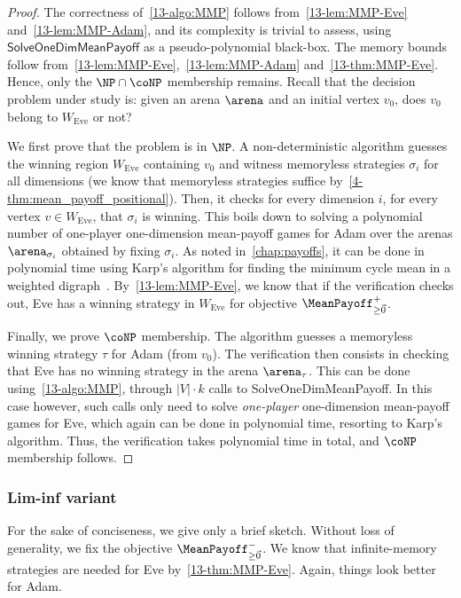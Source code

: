 \begin{proof}
The correctness of~\cref{13-algo:MMP} follows from~\cref{13-lem:MMP-Eve} and~\cref{13-lem:MMP-Adam}, and its complexity is trivial to assess, using $\textsf{SolveOneDimMeanPayoff}$ as a pseudo-polynomial black-box. The memory bounds follow from~\cref{13-lem:MMP-Eve},~\cref{13-lem:MMP-Adam} and~\cref{13-thm:MMP-Eve}. Hence, only the $\NP \cap \coNP$ membership remains. Recall that the decision problem under study is: given an arena $\arena$ and an initial vertex $v_0$, does $v_0$ belong to $W_{\text{Eve}}$ or not?

We first prove that the problem is in $\NP$. A non-deterministic algorithm guesses the winning region $W_{\text{Eve}}$ containing $v_0$ and witness memoryless strategies $\sigma_i$ for all dimensions (we know that memoryless strategies suffice by~\cref{4-thm:mean_payoff_positional}). Then, it checks for every dimension $i$, for every vertex $v \in W_{\text{Eve}}$, that $\sigma_i$ is winning. This boils down to solving a polynomial number of one-player one-dimension mean-payoff games for Adam over the arenas $\arena_{\sigma_i}$ obtained by fixing $\sigma_i$. As noted in~\cref{chap:payoffs},  it can be done in polynomial time using Karp's algorithm for finding the minimum cycle mean in a weighted digraph~\cite{Karp:1978}. By~\cref{13-lem:MMP-Eve}, we know that if the verification checks out, Eve has a winning strategy in $W_{\text{Eve}}$ for objective $\MeanPayoff^{+}_{\geq \vec{0}}$.

Finally, we prove $\coNP$ membership. The algorithm guesses a memoryless winning strategy $\tau$ for Adam (from $v_0$). The verification then consists in checking that Eve has no winning strategy in the arena $\arena_{\tau}$. This can be done using~\cref{13-algo:MMP}, through $\vert V \vert \cdot k$ calls to \textsf{SolveOneDimMeanPayoff}. In this case however, such calls only need to solve \textit{one-player} one-dimension mean-payoff games for Eve, which again can be done in polynomial time, resorting to Karp's algorithm. Thus, the verification takes polynomial time in total, and $\coNP$ membership follows.
\end{proof}

\subsubsection*{Lim-inf variant} For the sake of conciseness, we give only a brief sketch. Without loss of generality, we fix the objective $\MeanPayoff^{-}_{\geq \vec{0}}$. We know that infinite-memory strategies are needed for Eve by~\cref{13-thm:MMP-Eve}. Again, things look better for Adam.

